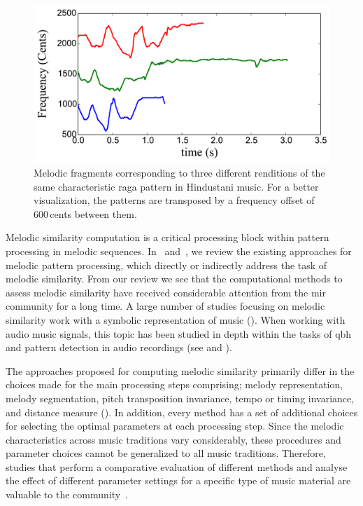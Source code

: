 \begin{figure}
	\begin{center}
		\includegraphics[width=\figSizeSeventyFive]{ch06_patterns/figures/SimilarityEvaluation/Hindustani3Patts.pdf}
	\end{center}
	\caption[Example of difference occurrences of a melodic pattern]{Melodic fragments corresponding to three different renditions of the same characteristic \gls{raga} pattern in Hindustani music. For a better visualization, the patterns are transposed by a frequency offset of 600\,cents between them.}
	\label{fig:examples_3_phrases}
\end{figure}

Melodic similarity computation is a critical processing block within pattern processing in melodic sequences. In~ and~, we review the existing approaches for melodic pattern processing, which directly or indirectly address the task of melodic similarity. From our review we see that the computational methods to assess melodic similarity have received considerable attention from the \gls{mir} community for a long time. A large number of studies focusing on melodic similarity work with a symbolic representation of music (). When working with audio music signals, this topic has been studied in depth within the tasks of \acrfull{qbh} and pattern detection in audio recordings (see  and ).

The approaches proposed for computing melodic similarity primarily differ in the choices made for the main processing steps comprising; melody representation, melody segmentation, pitch transposition invariance, tempo or timing invariance, and distance measure (). In addition, every method has a set of additional choices for selecting the optimal parameters at each processing step. Since the melodic characteristics across music traditions vary considerably, these procedures and parameter choices cannot be generalized to all music traditions. Therefore, studies that perform a comparative evaluation of different methods and analyse the effect of different parameter settings for a specific type of music material are valuable to the community~\citep{RBDannenberg2007QBH,Rao2014,XavierSerra2011}.

